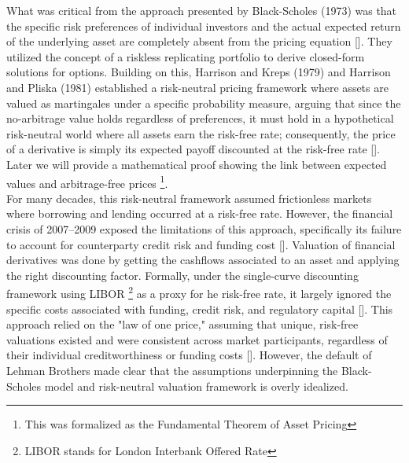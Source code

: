 \noindent
    What was critical from the approach presented by Black-Scholes (1973) was that the specific risk preferences of individual investors and the actual expected return of the underlying asset are completely absent from the pricing equation [\cite{krause2001overview}]. They utilized the concept of a riskless replicating portfolio to derive closed-form solutions for options. Building on this, Harrison and Kreps (1979) and Harrison and Pliska (1981) established a risk-neutral pricing framework where assets are valued as martingales under a specific probability measure, arguing that since the no-arbitrage value holds regardless of preferences, it must hold in a hypothetical risk-neutral world where all assets earn the risk-free rate; consequently, the price of a derivative is simply its expected payoff discounted at the risk-free rate [\cite{cox1976valuation}]. Later we will provide a mathematical proof showing the link between expected values and arbitrage-free prices \footnote{This was formalized as the Fundamental Theorem of Asset Pricing}. \\

\noindent 
    For many decades, this risk-neutral framework assumed frictionless markets where borrowing and lending occurred at a risk-free rate. However, the financial crisis of 2007–2009 exposed the limitations of this approach, specifically its failure to account for counterparty credit risk and funding cost [\cite{Gregory_2015}]. Valuation of financial derivatives was done by getting the cashflows associated to an asset and applying the right discounting factor. Formally, under the single-curve discounting framework using LIBOR \footnote{LIBOR stands for London Interbank Offered Rate} as a proxy for he risk-free rate, it largely ignored the specific costs associated with funding, credit risk, and regulatory capital [\cite{frode2022neural}]. This approach relied on the "law of one price," assuming that unique, risk-free valuations existed and were consistent across market participants, regardless of their individual creditworthiness or funding costs [\cite{Green_2016}]. However, the default of Lehman Brothers made clear that the assumptions underpinning the Black-Scholes model and risk-neutral valuation framework is overly idealized. \\ 
    
